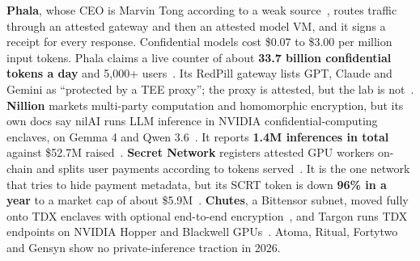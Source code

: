 \documentclass[10pt,a4paper]{article}
\begin{document}
\textbf{Phala}, whose CEO is Marvin Tong according to a weak source~\cite{coindesk-pha}, routes traffic through an attested gateway and then an attested model VM, and it signs a receipt for every response. Confidential models cost \$0.07 to \$3.00 per million input tokens. Phala claims a live counter of about \textbf{33.7 billion confidential tokens a day} and 5,000+ users~\cite{phala,phala-private-ai-inference}. Its RedPill gateway lists GPT, Claude and Gemini as ``protected by a TEE proxy''; the proxy is attested, but the lab is not~\cite{phala-cloud-redpill}. \textbf{Nillion} markets multi-party computation and homomorphic encryption, but its own docs say nilAI runs LLM inference in NVIDIA confidential-computing enclaves, on Gemma 4 and Qwen 3.6~\cite{nillion-docs-llms}. It reports \textbf{1.4M inferences in total} against \$52.7M raised~\cite{nillion-phase-2-upgrade,binance-research-nillion}. \textbf{Secret Network} registers attested GPU workers on-chain and splits user payments according to tokens served~\cite{secret-network-docs-secret}. It is the one network that tries to hide payment metadata, but its SCRT token is down \textbf{96\% in a year} to a market cap of about \$5.9M~\cite{coingecko-api-scrt}. \textbf{Chutes}, a Bittensor subnet, moved fully onto TDX enclaves with optional end-to-end encryption~\cite{chutes}, and Targon runs TDX endpoints on NVIDIA Hopper and Blackwell GPUs~\cite{iq-wiki-targon}. Atoma, Ritual, Fortytwo and Gensyn show no private-inference traction in 2026.
\end{document}
